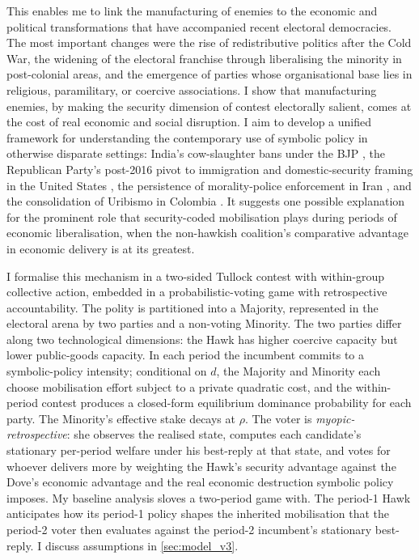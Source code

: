 \documentclass[11pt,twoside]{extarticle}
\begin{document}
This enables me to link the manufacturing of enemies to the economic and political transformations that have accompanied recent electoral democracies. The most important changes were the rise of redistributive politics after the Cold War, the widening of the electoral franchise through liberalising the minority in post-colonial areas, and the emergence of parties whose organisational base lies in religious, paramilitary, or coercive associations. I show that manufacturing enemies, by making the security dimension of contest electorally salient, comes at the cost of real economic and social disruption. I aim to develop a unified framework for understanding the contemporary use of symbolic policy in otherwise disparate settings: India's cow-slaughter bans under the BJP \citep{jaffrelotModisIndiaHindu2021}, the Republican Party's post-2016 pivot to immigration and domestic-security framing in the United States \citep{sidesIdentityCrisis20162019,mutzStatusThreatNot2018}, the persistence of morality-police enforcement in Iran \citep{bajoghliIranReframedAnxieties2020}, and the consolidation of Uribismo in Colombia \citep*{acemogluMonopolyViolenceEvidence2013}. It suggests one possible explanation for the prominent role that security-coded mobilisation plays during periods of economic liberalisation, when the non-hawkish coalition's comparative advantage in economic delivery is at its greatest.


I formalise this mechanism in a two-sided Tullock contest with within-group collective action, embedded in a probabilistic-voting game with retrospective accountability. The polity is partitioned into a Majority, represented in the electoral arena by two parties and a non-voting Minority. The two parties differ along two technological dimensions: the Hawk has higher coercive capacity but lower public-goods capacity. In each period the incumbent commits to a symbolic-policy intensity; conditional on $d$, the Majority and Minority each choose mobilisation effort subject to a private quadratic cost, and the within-period contest produces a closed-form equilibrium dominance probability for each party. The Minority's effective stake decays at $\rho$. The voter is \emph{myopic-retrospective}: she observes the realised state, computes each candidate's stationary per-period welfare under his best-reply at that state, and votes for whoever delivers more by weighting the Hawk's security advantage against the Dove's economic advantage and the real economic destruction symbolic policy imposes. My baseline analysis sloves a two-period game with. The period-1 Hawk anticipates how its period-1 policy shapes the inherited mobilisation that the period-2 voter then evaluates against the period-2 incumbent's stationary best-reply. I discuss assumptions in \autoref{sec:model_v3}.
\end{document}
